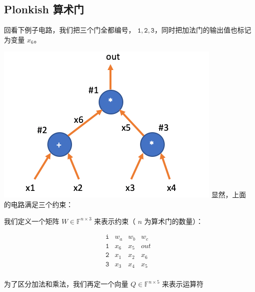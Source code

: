 \hypertarget{plonkish-ux7b97ux672fux95e8}{%
\subsection{Plonkish 算术门}\label{plonkish-ux7b97ux672fux95e8}}

回看下例子电路，我们把三个门全都编号，
\(\texttt{1},\texttt{2},\texttt{3}\)，同时把加法门的输出值也标记为变量
\(x_6\)。

\includegraphics{img/img20230414202348.png}
显然，上面的电路满足三个约束：


我们定义一个矩阵 \(W\in\mathbb{F}^{n\times 3}\) 来表示约束（ \(n\)
为算术门的数量）：

\[
\begin{array}{c|c|c|c|}
\texttt{i} & w_a & w_b & w_c  \\
\hline
\texttt{1} & x_6 & x_5 & out \\
\texttt{2} & x_1 & x_2 & x_6 \\
\texttt{3} & x_3 & x_4 & x_5 \\
\end{array}
\]

为了区分加法和乘法，我们再定一个向量 \(Q\in\mathbb{F}^{n\times5}\)
来表示运算符


